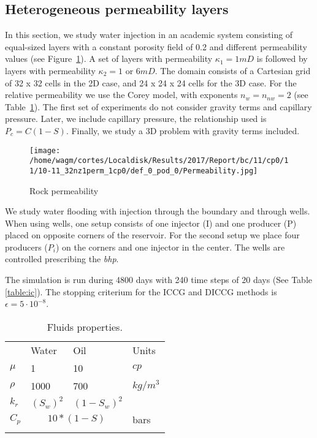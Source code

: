 \documentclass[times,final]{elsarticle}
\begin{document}
\subsection{Heterogeneous permeability layers}\label{sec:4.1}
In this section, we study water injection in an academic system consisting of equal-sized layers with a constant porosity field of 0.2 and different permeability values (see Figure~\ref{fig:rockperm1}). A set of layers with permeability $\kappa_1=1mD$ is followed by layers with permeability $\kappa_2 = 1$ or $6mD$. 
The domain consists of a Cartesian grid of 32 x 32 cells in the 2D case, and 24 x 24 x 24 cells for the 3D case. For the relative permeability we use the Corey model, with exponents $n_w=n_{nw}=2$ (see Table~\ref{table:fluids}).  The first set of experiments do not consider gravity terms and capillary pressure. Later, we include capillary pressure, the relationship used is $P_c = C(1-S)$. 
Finally, we study a 3D problem with gravity terms included. \par
\begin{figure}
  \texttt{[image: /home/wagm/cortes/Localdisk/Results/2017/Report/bc/11/cp0/11/10-11\_32nz1perm\_1cp0/def\_0\_pod\_0/Permeability.jpg]}
\caption{Rock permeability}
\label{fig:rockperm1}      
\end{figure}
We study water flooding with injection through the boundary and through wells.
When using wells, one setup consists of one injector (I) and one producer (P) placed on opposite corners of the reservoir. For the second setup we place four producers ($P_i$) on the corners and one injector in the center. The wells are controlled prescribing the \emph{bhp}.\par
The simulation is run during 4800 days with 240 time steps of 20 days (See Table \ref{table:ic}). The stopping criterium for the ICCG and DICCG methods is $\epsilon =5\cdot10^{-8}$.

\begin{table}\small
\caption{Fluids properties.}
\label{table:fluids}    %
\begin{tabular}{llll}

\hline\noalign{\smallskip}
&Water&Oil&Units\\
\noalign{\smallskip}\hline\noalign{\smallskip}
$\mu$&     1&    10 & $cp$ \\
$\rho$& 1000& 700& $kg/m^3$\\
$k_r$&$(S_w)^2$&   $(1-S_w)^2$ \\
\hline
\hline
 $C_p$&\multicolumn{2}{|c|}{$10*(1-S)$}&bars\\
 \hline
\noalign{\smallskip}\hline
\end{tabular}
\end{table}
\end{document}
